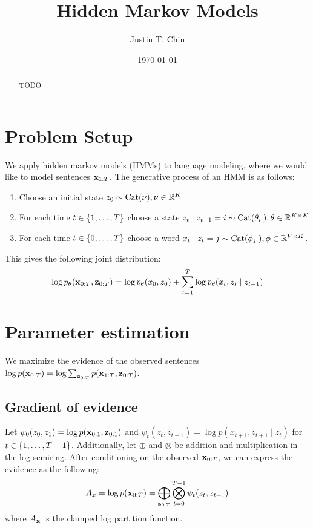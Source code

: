\documentclass[12pt]{article}
\title{Hidden Markov Models}
\author{
Justin T. Chiu
}
\date{\today}
\begin{document}
\maketitle

\begin{abstract}
TODO
\end{abstract}

\section{Problem Setup}
We apply hidden markov models (HMMs) to language modeling,
where we would like to model sentences $\mathbf{x}_{1:T}$.
The generative process of an HMM is as follows:
\begin{enumerate}
\item Choose an initial state $z_0 \sim \mathrm{Cat}(\nu), \nu \in \mathbb{R}^K$
\item For each time $t \in \left\{1, \ldots, T\right\}$ choose a state
$z_t \mid z_{t-1}=i \sim \mathrm{Cat}(\theta_{i\cdot}), \theta \in \mathbb{R}^{K \times K}$
\item For each time $t \in \left\{0, \ldots, T\right\}$ choose a word
$x_t \mid z_t=j \sim \mathrm{Cat}(\phi_{j\cdot}), \phi \in \mathbb{R}^{V \times K}$.
\end{enumerate}

This gives the following joint distribution:
\begin{align*}
\log p_\theta(\mathbf{x}_{0:T}, \mathbf{z}_{0:T})
&= \log p_\theta(x_0, z_0) + \sum_{t=1}^T \log p_\theta(x_t, z_t \mid z_{t-1})\\
\end{align*}

\section{Parameter estimation}
We maximize the evidence of the observed sentences
$\log p(\mathbf{x}_{0:T}) = \log \sum_{\mathbf{z}_{0:T}} p(\mathbf{x}_{1:T}, \mathbf{z}_{0:T})$.

\subsection{Gradient of evidence}
Let $\psi_0(z_0, z_1) = \log p(\mathbf{x}_{0:1}, \mathbf{z}_{0:1})$ and
$\psi_t(z_{t}, z_{t+1}) = \log p(x_{t+1}, z_{t+1} \mid z_{t})$ for $t \in \left\{1, \ldots, T-1\right\}$.
Additionally, let $\oplus$ and $\otimes$ be addition and multiplication in the log semiring.
After conditioning on the observed $\mathbf{x}_{0:T}$, we can express the evidence as the following:
$$A_x = \log p(\mathbf{x}_{0:T}) = \bigoplus_{\mathbf{z}_{0:T}}\bigotimes_{t=0}^{T-1} \psi_t(z_t, z_{t+1})$$
where $A_{\mathbf{x}}$ is the clamped log partition function.
\end{document}
